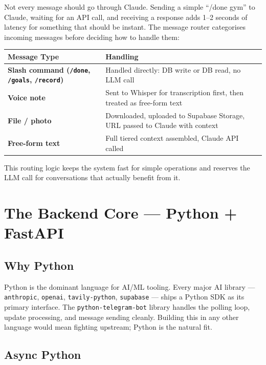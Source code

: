 \documentclass[12pt, a4paper]{article}
\begin{document}
Not every message should go through Claude. Sending a simple ``/done gym'' to Claude, waiting for an API call, and receiving a response adds 1--2 seconds of latency for something that should be instant. The message router categorises incoming messages before deciding how to handle them:

\begin{longtable}{>{\bfseries}p{4cm} p{10cm}}
\toprule
Message Type & Handling \\
\midrule
Slash command (\texttt{/done}, \texttt{/goals}, \texttt{/record}) & Handled directly: DB write or DB read, no LLM call \\
\addlinespace
Voice note & Sent to Whisper for transcription first, then treated as free-form text \\
\addlinespace
File / photo & Downloaded, uploaded to Supabase Storage, URL passed to Claude with context \\
\addlinespace
Free-form text & Full tiered context assembled, Claude API called \\
\bottomrule
\end{longtable}

This routing logic keeps the system fast for simple operations and reserves the LLM call for conversations that actually benefit from it.

\section{The Backend Core --- Python + FastAPI}

\subsection{Why Python}

Python is the dominant language for AI/ML tooling. Every major AI library --- \texttt{anthropic}, \texttt{openai}, \texttt{tavily-python}, \texttt{supabase} --- ships a Python SDK as its primary interface. The \texttt{python-telegram-bot} library handles the polling loop, update processing, and message sending cleanly. Building this in any other language would mean fighting upstream; Python is the natural fit.

\subsection{Async Python}
\end{document}
